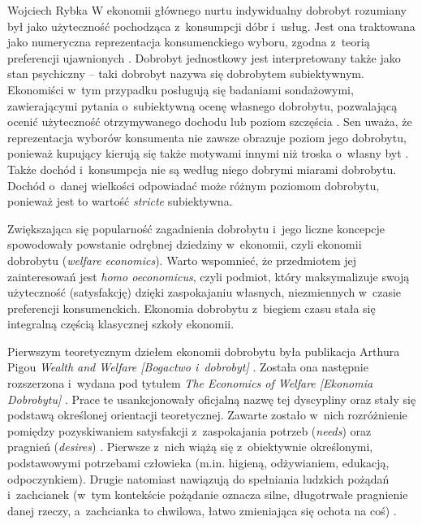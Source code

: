 \begin{artplenv}{Wojciech Rybka}
W ekonomii głównego nurtu indywidualny dobrobyt rozumiany był jako użyteczność pochodząca z~konsumpcji dóbr i~usług.
Jest ona traktowana jako numeryczna reprezentacja konsumenckiego wyboru, zgodna z~teorią preferencji ujawnionych
\parencites{boehm_is_2002}{ostapiuk_droga_2019}.
Dobrobyt jednostkowy jest interpretowany także jako
stan psychiczny -- taki dobrobyt nazywa się dobrobytem subiektywnym. Ekonomiści w~tym przypadku posługują się badaniami
sondażowymi, zawierającymi pytania o~subiektywną ocenę własnego dobrobytu, pozwalającą ocenić użyteczność otrzymywanego
dochodu
\parencite{kot_ekonometryczne_2000}
lub poziom szczęścia
\parencite{blanchflower_well-being_2004}.
Sen uważa, że reprezentacja wyborów konsumenta nie zawsze obrazuje poziom jego dobrobytu, ponieważ
kupujący kierują się także motywami innymi niż troska o~własny byt
\parencite{zaremba_dobrobyt_2016}.
Także
dochód i~konsumpcja nie są według niego dobrymi miarami dobrobytu. Dochód o~danej wielkości odpowiadać może różnym
poziomom dobrobytu, ponieważ jest to wartość \textit{stricte} subiektywna. 

Zwiększająca się popularność zagadnienia dobrobytu i~jego liczne koncepcje spowodowały powstanie odrębnej
dziedziny w~ekonomii, czyli ekonomii dobrobytu (\textit{welfare economics}). Warto wspomnieć,
że przedmiotem jej zainteresowań jest
\textit{homo oeconomicus}, czyli podmiot, który maksymalizuje swoją użyteczność (satysfakcję) dzięki zaspokajaniu
własnych, niezmiennych w~czasie preferencji konsumenckich. Ekonomia dobrobytu z~biegiem czasu stała się integralną
częścią klasycznej szkoły ekonomii. 

Pierwszym teoretycznym dziełem ekonomii dobrobytu była publikacja Arthura Pigou  \textit{Wealth and Welfare
[Bogactwo i~dobrobyt]}
\parencite*{pigou_wealth_1912}.
Została ona następnie rozszerzona i~wydana pod tytułem \textit{The
Economics of Welfare [Ekonomia Dobrobytu]}
\parencite*{pigou_economics_1920}.
Prace te usankcjonowały oficjalną nazwę tej
dyscypliny oraz stały się podstawą określonej orientacji teoretycznej. Zawarte zostało w~nich rozróżnienie pomiędzy
pozyskiwaniem satysfakcji z~zaspokajania potrzeb (\mbox{\textit{needs}}) oraz pragnień (\textit{desires})
\parencite{czech_ekonomia_2014}.
Pierwsze z~nich wiążą się z~obiektywnie określonymi, podstawowymi potrzebami
człowieka (m.in. higieną, odżywianiem, edukacją, odpoczynkiem). Drugie natomiast nawiązują do spełniania ludzkich
pożądań i~zachcianek (w~tym kontekście pożądanie oznacza silne, długotrwałe pragnienie danej rzeczy, a~zachcianka to
chwilowa, łatwo zmieniająca się ochota na coś)
\parencite{czech_ekonomia_2014}.


\end{artplenv}
